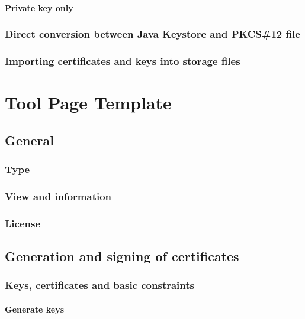 \documentclass[10pt, a4paper]{report}
\begin{document}
    \subsubsection{Private key only}
    
  \subsection{Direct conversion between Java Keystore and PKCS\#12 file}
  
  \subsection{Importing certificates and keys into storage files}
  


\chapter{Tool Page Template}

\section{General}

  \subsection{Type}
  
  \subsection{View and information}
  
  \subsection{License}

  
\section{Generation and signing of certificates}

  \subsection{Keys, certificates and basic constraints}
  
    \subsubsection{Generate keys}
    
\end{document}
